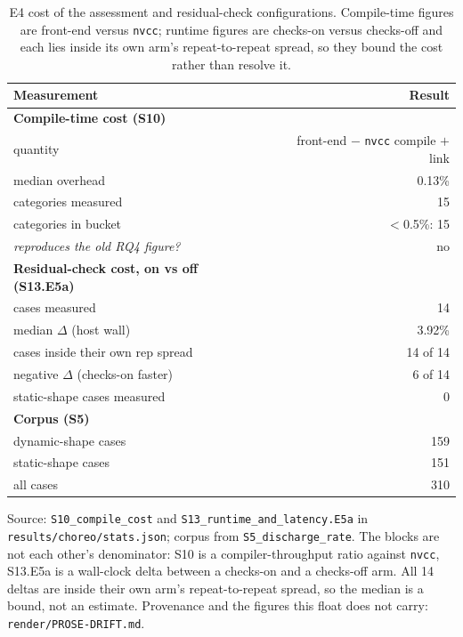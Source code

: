 \begin{table}[t]
\centering\footnotesize
\caption{E4 cost of the assessment and residual-check configurations. Compile-time figures are front-end versus \texttt{nvcc}; runtime figures are checks-on versus checks-off and each lies inside its own arm's repeat-to-repeat spread, so they bound the cost rather than resolve it.}
\label{tab:e4-cost}
\begin{tabular}{@{}lr@{}}
\toprule
Measurement & Result \\
\midrule
\textbf{Compile-time cost (S10)} &  \\
quantity & front-end $-$ \texttt{nvcc} compile $+$ link \\
median overhead & 0.13\% \\
categories measured & 15 \\
categories in bucket & $<$0.5\%: 15 \\
\textit{reproduces the old RQ4 figure?} & no \\
\midrule
\textbf{Residual-check cost, on vs off (S13.E5a)} &  \\
cases measured & 14 \\
median $\Delta$ (host wall) & 3.92\% \\
cases inside their own rep spread & 14 of 14 \\
negative $\Delta$ (checks-on faster) & 6 of 14 \\
static-shape cases measured & 0 \\
\midrule
\textbf{Corpus (S5)} &  \\
dynamic-shape cases & 159 \\
static-shape cases & 151 \\
all cases & 310 \\
\bottomrule
\end{tabular}
\vspace{0.4em}\begin{minipage}{0.98\linewidth}\raggedright\footnotesize Source: \texttt{S10\_compile\_cost} and \texttt{S13\_runtime\_and\_latency.E5a} in \texttt{results/choreo/stats.json}; corpus from \texttt{S5\_discharge\_rate}. The blocks are not each other's denominator: S10 is a compiler-throughput ratio against \texttt{nvcc}, S13.E5a is a wall-clock delta between a checks-on and a checks-off arm. All 14 deltas are inside their own arm's repeat-to-repeat spread, so the median is a bound, not an estimate. Provenance and the figures this float does not carry: \texttt{render/PROSE-DRIFT.md}.\end{minipage}
\end{table}
